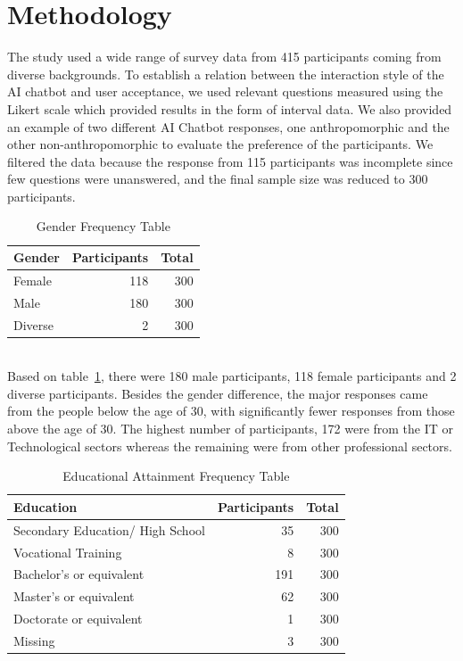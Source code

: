 \documentclass[conference]{IEEEtran}
\begin{document}
\section{Methodology}
The study used a wide range of survey data from 415 participants coming from diverse backgrounds. To establish a relation between the interaction style of the AI chatbot and user acceptance, we used relevant questions measured using the Likert scale which provided results in the form of interval data. We also provided an example of two different AI Chatbot responses, one anthropomorphic and the other non-anthropomorphic to evaluate the preference of the participants. We filtered the data because the response from 115 participants was incomplete since few questions were unanswered, and the final sample size was reduced to 300 participants.   
\begin{table}[ht]
    \centering
    \caption{Gender Frequency Table}
    \label{tab:genderTest}
    \begin{tabular}{lrr}
        \toprule
        \textbf{Gender} & \textbf{Participants} & \textbf{Total} \\
        \midrule
        Female & 118 & 300 \\
        Male & 180 & 300 \\
        Diverse & 2 & 300 \\
        \bottomrule
    \end{tabular}
\end{table}
\\

Based on table~\ref{tab:genderTest}, there were 180 male participants, 118 female participants and 2 diverse participants. Besides the gender difference, the major responses came from the people below the age of 30, with significantly fewer responses from those above the age of 30. The highest number of participants, 172 were from the IT or Technological sectors whereas the remaining were from other professional sectors.

\begin{table}[ht]
    \centering
    \caption{Educational Attainment Frequency Table}
    \label{tab:educationalTest}
    \begin{tabular}{lrr}
        \toprule
        \textbf{Education} & \textbf{Participants} & \textbf{Total} \\
        \midrule
        Secondary Education/ High School & 35 & 300 \\
		Vocational Training & 8 & 300 \\
        Bachelor's or equivalent & 191 & 300 \\
        Master's or equivalent & 62 & 300 \\
		Doctorate or equivalent & 1 & 300 \\
		Missing & 3 & 300 \\
        \bottomrule
    \end{tabular}
\end{table}
\end{document}
